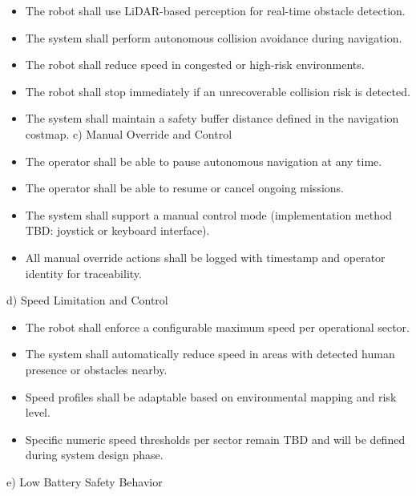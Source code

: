 \begin{itemize}
    \item The robot shall use LiDAR-based perception for real-time obstacle detection.
    \item The system shall perform autonomous collision avoidance during navigation.
    \item The robot shall reduce speed in congested or high-risk environments.
    \item The robot shall stop immediately if an unrecoverable collision risk is detected.
    \item The system shall maintain a safety buffer distance defined in the navigation costmap.
c) Manual Override and Control

    \item The operator shall be able to pause autonomous navigation at any time.
    \item The operator shall be able to resume or cancel ongoing missions.
    \item The system shall support a manual control mode (implementation method TBD:
joystick or keyboard interface).

    \item All manual override actions shall be logged with timestamp and operator identity for
traceability.

\end{itemize}

d) Speed Limitation and Control

\begin{itemize}
    \item The robot shall enforce a configurable maximum speed per operational sector.
    \item The system shall automatically reduce speed in areas with detected human presence
or obstacles nearby.

    \item Speed profiles shall be adaptable based on environmental mapping and risk level.
    \item Specific numeric speed thresholds per sector remain TBD and will be defined during
system design phase.

\end{itemize}

e) Low Battery Safety Behavior

